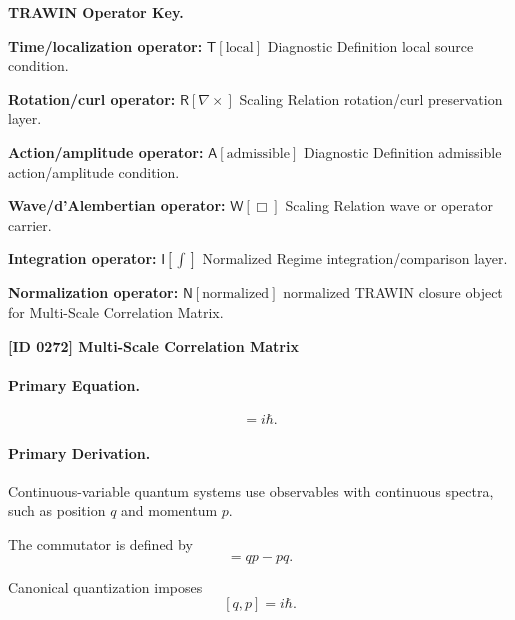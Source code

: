 \par\vspace{0.45\baselineskip}
\noindent\begin{minipage}[t]{\linewidth}
\begingroup
\small
\raggedright
\textbf{TRAWIN Operator Key.}\par
\noindent\textbf{Time/localization operator:} $\mathsf{T}\!\left[\mathrm{local}\right]$ Diagnostic Definition local source condition.\par
\noindent\textbf{Rotation/curl operator:} $\mathsf{R}\!\left[\nabla\times\right]$ Scaling Relation rotation/curl preservation layer.\par
\noindent\textbf{Action/amplitude operator:} $\mathsf{A}\!\left[\mathrm{admissible}\right]$ Diagnostic Definition admissible action/amplitude condition.\par
\noindent\textbf{Wave/d'Alembertian operator:} $\mathsf{W}\!\left[\Box\right]$ Scaling Relation wave or operator carrier.\par
\noindent\textbf{Integration operator:} $\mathsf{I}\!\left[\int\right]$ Normalized Regime integration/comparison layer.\par
\noindent\textbf{Normalization operator:} $\mathsf{N}\!\left[\mathrm{normalized}\right]$ normalized TRAWIN closure object for Multi-Scale Correlation Matrix.\par
\endgroup
\end{minipage}

\clearpage
\noindent\textbf{[ID 0272] Multi-Scale Correlation Matrix}\par
\vspace{0.35em}
\paragraph{Primary Equation.}
\begin{equation}
[q,p]=i\hbar .
\end{equation}

\paragraph{Primary Derivation.}
Continuous-variable quantum systems use observables with continuous spectra, such as position $q$ and momentum $p$.

The commutator is defined by
\begin{equation}
[q,p]=qp-pq .
\end{equation}

Canonical quantization imposes
\begin{equation}
\boxed{
[q,p]=i\hbar .
}
\end{equation}

